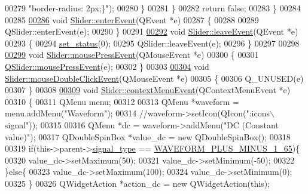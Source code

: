 \begin{DoxyCode}
00279                          \textcolor{stringliteral}{"border-radius: 2px;\}"});
00280         \}
00281     \}
00282     \textcolor{keywordflow}{return} \textcolor{keyword}{false};
00283 \}
00284 
00285 
\hypertarget{a00133_source_l00286}{}\hyperlink{a00077_ad7ad2fd0571f0f8486732f783802eb0e}{00286} \textcolor{keywordtype}{void} \hyperlink{a00077_ad7ad2fd0571f0f8486732f783802eb0e}{Slider::enterEvent}(QEvent *e)
00287 \{
00288 
00289     QSlider::enterEvent(e);
00290 \}
00291 
\hypertarget{a00133_source_l00292}{}\hyperlink{a00077_a40078aca597449b51938078628c695ae}{00292} \textcolor{keywordtype}{void} \hyperlink{a00077_a40078aca597449b51938078628c695ae}{Slider::leaveEvent}(QEvent *e)
00293 \{
00294     \hyperlink{a00077_a567902754e43310fe921b74c9d1862dd}{set\_status}(0);
00295     QSlider::leaveEvent(e);
00296 \}
00297 
00298 
\hypertarget{a00133_source_l00299}{}\hyperlink{a00077_a99f35b6c6aa1ffa696ac44e558bb3dab}{00299} \textcolor{keywordtype}{void} \hyperlink{a00077_a99f35b6c6aa1ffa696ac44e558bb3dab}{Slider::mousePressEvent}(QMouseEvent *e)
00300 \{
00301    \hyperlink{a00116_a460b092e82c0eb94ef6c32a10acc822a}{QSlider::mousePressEvent}(e);
00302 \}
00303 
\hypertarget{a00133_source_l00304}{}\hyperlink{a00077_a408a766481a987b9f165de7bd54a1a38}{00304} \textcolor{keywordtype}{void} \hyperlink{a00077_a408a766481a987b9f165de7bd54a1a38}{Slider::mouseDoubleClickEvent}(QMouseEvent *e)
00305 \{
00306     Q\_UNUSED(e)
00307 \}
00308 
\hypertarget{a00133_source_l00309}{}\hyperlink{a00077_ac5ddce14c487d6bc720035cf338e8021}{00309} \textcolor{keywordtype}{void} \hyperlink{a00077_ac5ddce14c487d6bc720035cf338e8021}{Slider::contextMenuEvent}(QContextMenuEvent *e)
00310 \{
00311     QMenu menu;
00312 
00313     QMenu   *waveform = menu.addMenu(\textcolor{stringliteral}{"Waveform"});
00314              \textcolor{comment}{//waveform->setIcon(QIcon(":icons\(\backslash\)signal"));}
00315 
00316     QMenu   *dc = waveform->addMenu(\textcolor{stringliteral}{"DC (Constant value)"});
00317     QDoubleSpinBox *value\_dc = \textcolor{keyword}{new} QDoubleSpinBox();
00318 
00319     \textcolor{keywordflow}{if}(this->parent->\hyperlink{a00008_a070edaec5aee6ba1f5a6866bc32c8ce4}{signal\_type} == \hyperlink{a00090_a0923d3b365a36e1e8c401cec964aa36f}{WAVEFORM\_PLUS\_MINUS\_1\_65})\{
00320     value\_dc->setMaximum(50);
00321     value\_dc->setMinimum(-50);
00322     \}\textcolor{keywordflow}{else}\{
00323     value\_dc->setMaximum(100);
00324     value\_dc->setMinimum(0);
00325     \}
00326     QWidgetAction *action\_dc = \textcolor{keyword}{new} QWidgetAction(\textcolor{keyword}{this});

\end{DoxyCode}
